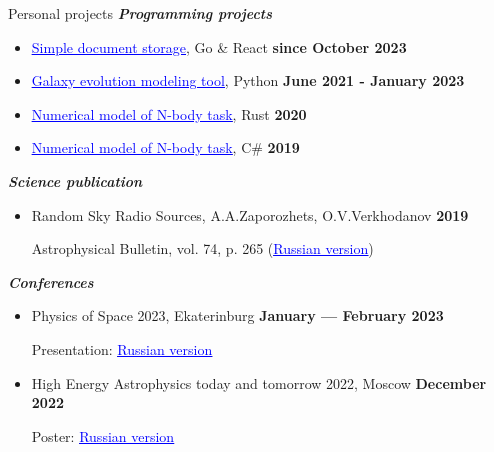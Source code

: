 \documentclass{resume} %
\newcommand{\link}[2]{\href{#1}{\textcolor{blue}{\underline{#2}}}}
\newcommand{\subheader}[1]{\textbf{\textit{#1}}}
\newcommand{\timestamp}[1]{\hfill {\small \textbf{#1}}}
\newcommand{\longversion}[1]{\ifdefined\LONG#1\fi}
\begin{document}
	\begin{rSection}{Personal projects}
		\subheader{Programming projects}
		\begin{itemize}
			\item \link{https://github.com/Kraysent/Documents}{Simple document storage}, Go \& React \timestamp{since October 2023}
			\item \link{https://github.com/Kraysent/OMTool}{Galaxy evolution modeling tool}, Python \timestamp{June 2021 - January 2023}
			\item \link{https://github.com/Kraysent/XBodyModel}{Numerical model of N-body task}, Rust \timestamp{2020}
			\item \link{https://github.com/Kraysent/Gravity-Model}{Numerical model of N-body task}, C\# \timestamp{2019}
		\end{itemize}

		\vspace{1em}

		\subheader{Science publication}
		\begin{itemize}
			\item Random Sky Radio Sources, A.A.Zaporozhets, O.V.Verkhodanov \timestamp{2019}
		
			Astrophysical Bulletin, vol. 74, p. 265 (\link{http://www.sao.ru/Doc-k8/Science/Public/Bulletin/Vol74/N3/ASPB265.pdf}{Russian version})
		\end{itemize}

		\vspace{1em}

		\longversion{
			\vspace{1em}

			\subheader{Conferences}
			\begin{itemize}
				\item Physics of Space 2023, Ekaterinburg \timestamp{January --- February 2023}
				
				Presentation: \link{https://www.overleaf.com/read/mnwwgvkqxdky}{Russian version}
				\item High Energy Astrophysics today and tomorrow 2022, Moscow \timestamp{December 2022}
				
				Poster: \link{https://www.overleaf.com/read/cwyptqpmdtdf}{Russian version}
			\end{itemize}
		}
	\end{rSection}
\end{document}
